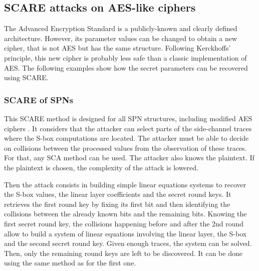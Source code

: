\documentclass[11pt]{sdm}
\begin{document}



\subsection{SCARE attacks on AES-like ciphers}

The Advanced Encryption Standard is a publicly-known and clearly defined architecture. 
However, its parameter values can be changed to obtain a new cipher, that is not AES but has the same structure.
Following Kerckhoffs' principle, this new cipher is probably less safe than a classic implementation of AES.
The following examples show how the secret parameters can be recovered using SCARE.

\subsubsection{SCARE of SPNs}
\label{scare_of_spns}

This SCARE method is designed for all SPN structures, including modified AES ciphers \parencite{Rivain_Roche_2013}.
It considers that the attacker can select parts of the side-channel traces where the S-box computations are located.
The attacker must be able to decide on collisions between the processed values from the observation of these traces.
For that, any SCA method can be used.
The attacker also knows the plaintext.
If the plaintext is chosen, the complexity of the attack is lowered.

Then the attack consists in building simple linear equations systems to recover the S-box values, the linear layer coefficients and the secret round keys.
It retrieves the first round key by fixing its first bit and then identifying the collisions between the already known bits and the remaining bits.
Knowing the first secret round key, the collisions happening before and after the 2nd round allow to build a system of linear equations involving the linear layer, the S-box and the second secret round key.
Given enough traces, the system can be solved.
Then, only the remaining round keys are left to be discovered.
It can be done using the same method as for the first one.
\end{document}
